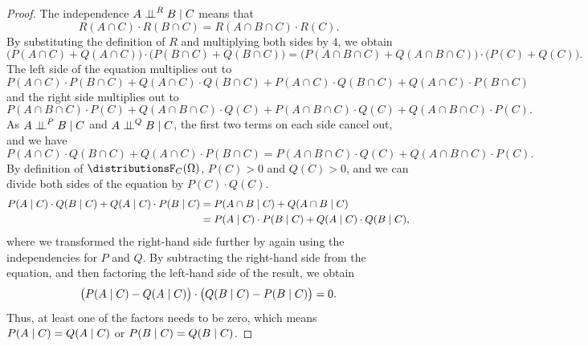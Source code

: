 \documentclass[USenglish,onecolumn]{article}
\begin{document}
\begin{proof}
  The independence $A \mathrel{\perp\!\!\!\perp}^R B \mid C$ means that
  \begin{equation*}
    R(A \cap C) \cdot R(B \cap C) = R(A \cap B \cap C) \cdot R(C).
  \end{equation*}
  By substituting the definition of $R$ and multiplying both sides by $4$, we obtain
  \begin{equation*}
    \big( P(A \cap C) + Q(A \cap C) \big) \cdot \big(P(B \cap C) + Q(B \cap C) \big)
    =
    \big( P(A \cap B \cap C) + Q(A \cap B \cap C) \big) \cdot \big( P(C) + Q(C) \big).
  \end{equation*}
  The left side of the equation multiplies out to
    \begin{equation*}
    P(A \cap C) \cdot P(B \cap C)+ Q(A \cap C) \cdot Q(B \cap C)+ P(A \cap C) \cdot Q(B \cap C) + Q(A \cap C) \cdot P(B \cap C)
  \end{equation*}
  and the right side multiplies out to
    \begin{equation*}
P(A \cap B \cap C) \cdot P(C)+Q(A \cap B \cap C) \cdot Q(C)+ P(A \cap B \cap C) \cdot Q(C) + Q(A \cap B \cap C) \cdot P(C).
  \end{equation*}
  As $A \mathrel{\perp\!\!\!\perp}^P B \mid C$ and $A \mathrel{\perp\!\!\!\perp}^Q B \mid C$, the first two terms on each side cancel out, and we have
  \begin{equation*}
    P(A \cap C) \cdot Q(B \cap C) + Q(A \cap C) \cdot P(B \cap C) = P(A \cap B \cap C) \cdot Q(C) + Q(A \cap B \cap C) \cdot P(C).
  \end{equation*}
  By definition of $\distributionsF_C(\Omg)$, $P(C)>0$ and $Q(C)>0$, and we can divide both sides of the equation by $P(C) \cdot Q(C)$.
  \begin{align*}
    P(A \mid C) \cdot Q(B \mid C) + Q(A \mid C) \cdot P(B \mid C)
    &= P(A \cap B \mid C) + Q(A \cap B \mid C) \\
    &= P(A \mid C) \cdot P(B \mid C) + Q(A \mid C) \cdot Q(B \mid C),
  \end{align*}
  where we transformed the right-hand side further by again using the independencies for $P$ and $Q$.
  By subtracting the right-hand side from the equation, and then factoring the left-hand side of the result, we obtain
  \begin{equation*}
    \big( P(A \mid C) - Q(A \mid C) \big) \cdot \big( Q(B \mid C) - P(B \mid C) \big) = 0.
  \end{equation*}
  Thus, at least one of the factors needs to be zero, which means $P(A \mid C) = Q(A \mid C)$ or $P(B \mid C) = Q(B \mid C)$.
\end{proof}
\end{document}
